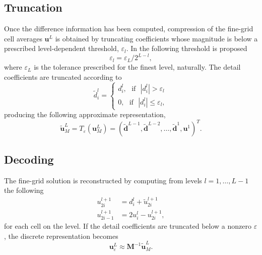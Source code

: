 \documentclass[]{article}
\begin{document}
    \subsection*{Truncation}

        Once the difference information has been computed, compression of the
        fine-grid cell averages $\bm{u}^{L}$ is obtained by truncating
        coefficients whose magnitude is below a prescribed level-dependent
        threshold, $\varepsilon_{l}$.  In \cite{harten1994} the following
        threshold is proposed
        \begin{equation}
            \varepsilon_{l} = \varepsilon_{L} / 2^{L-l},
        \end{equation}
        where $\varepsilon_{L}$ is the tolerance prescribed for the finest
        level, naturally.  The detail coefficients are truncated according to
        \begin{equation}
            \tilde{d}^{l}_{i} =
                \begin{cases}
                    d^{l}_{i}, \text{ } \text{if} \text{ } |d^{l}_{i}| > \varepsilon_{l} \\
                    0, \text{ } \text{if} \text{ } |d^{l}_{i}| \leq
                    \varepsilon_{l},
                \end{cases}
        \end{equation}
        producing the following approximate representation,
        \begin{equation}
            \tilde{\bm{u}}^{L}_{M} = T_{\varepsilon}(\bm{u}^{L}_{M}) = \left(
            \tilde{\bm{d}}^{L-1}, \tilde{\bm{d}}^{L-2},
            \dots, \tilde{\bm{d}}^{1}, \bm{u}^{1} \right)^{T}.
        \end{equation}
        
    \subsection*{Decoding}

        The fine-grid solution is reconstructed by computing from levels
        $l=1,\dots,L-1$ the following
        \begin{align}
            u_{2i}^{l+1} & = d_{i}^{l} + \tilde{u}_{2i}^{l+1} \\
            u_{2i-1}^{l+1} & = 2 u_{i}^{l} - u_{2i}^{l+1},
        \end{align}
        for each cell on the level.  If the detail coefficients are truncated
        below a nonzero $\varepsilon$, the discrete representation becomes
        \begin{equation}
            \bm{u}^{L}_{\varepsilon} \approx \bm{M}^{-1} \tilde{\bm{u}}^{L}_{M}.
        \end{equation}
\end{document}
